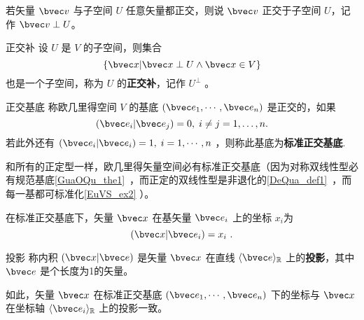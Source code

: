 若矢量 $\bvec v$ 与子空间 $U$ 任意矢量都正交，则说 $\bvec v$ 正交于子空间 $U$，记作 $\bvec v\perp U$。
\begin{definition}{正交补}
设 $U$ 是 $V$ 的子空间，则集合
\begin{equation}
\{\bvec x|\bvec x\perp U\wedge\bvec x\in V\}
\end{equation}
也是一个子空间，称为 $U$ 的\textbf{正交补}，记作 $U^{\perp}$ 。
\end{definition}
\begin{definition}{正交基底}
称欧几里得空间 $V$ 的基底 $(\bvec e_1,\cdots,\bvec e_n)$ 是正交的，如果
\begin{equation}
(\bvec e_i|\bvec e_j)=0,\;i\neq j=1,\dots,n.
\end{equation}
若此外还有 $(\bvec e_i|\bvec e_i)=1,\;i=1,\cdots ,n$ ，则称此基底为\textbf{标准正交基底}.
\end{definition}

和所有的正定型一样，欧几里得矢量空间必有标准正交基底（因为对称双线性型必有规范基底\autoref{GuaOQu_the1}~，而正定的双线性型是非退化的\autoref{DeQua_def1}~，而每一基都可标准化\autoref{EuVS_ex2} ）。
\begin{exercise}{}
在标准正交基底下，矢量 $\bvec x$ 在基矢量 $\bvec e_i$ 上的坐标 $x_i$为
\begin{equation}
(\bvec x|\bvec e_i)=x_i~.
\end{equation}
\end{exercise}
\begin{definition}{投影}
称内积 $(\bvec x|\bvec e)$ 是矢量 $\bvec x$ 在直线 $\langle\bvec e\rangle_{\mathbb R}$ 上的\textbf{投影}，其中 $\bvec e$ 是个长度为1的矢量。  
\end{definition}
如此，矢量 $\bvec x$ 在标准正交基底 $(\bvec e_1,\cdots,\bvec e_n)$ 下的坐标与 $\bvec x$ 在坐标轴 $\langle\bvec e_i\rangle_\mathbb{R}$ 上的投影一致。 